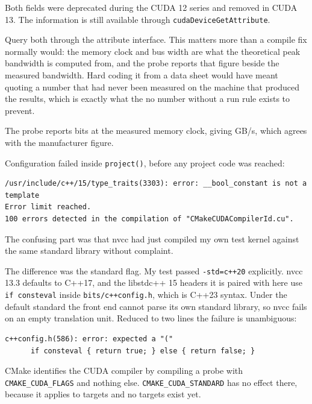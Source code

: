  Both fields were deprecated during the CUDA 12 series and
removed in CUDA 13. The information is still available through
\texttt{cudaDeviceGetAttribute}.

 Query both through the attribute interface. This matters
more than a compile fix normally would: the memory clock and bus width are what
the theoretical peak bandwidth is computed from, and the probe reports that figure beside
the measured bandwidth. Hard coding it from a data sheet would have meant quoting a number that had never
been measured on the machine that produced the results, which is exactly what
the no number without a run rule exists to prevent.

 The probe reports \GpuBusBits{} bits at the measured
memory clock, giving \GpuPeakBandwidth{} GB/s, which agrees with the
manufacturer figure.


 Configuration failed inside \texttt{project()}, before any
project code was reached:

\begin{lstlisting}
/usr/include/c++/15/type_traits(3303): error: __bool_constant is not a template
Error limit reached.
100 errors detected in the compilation of "CMakeCUDACompilerId.cu".
\end{lstlisting}

The confusing part was that nvcc had just compiled my own test kernel against
the same standard library without complaint.

 The difference was the standard flag. My test passed
\texttt{-std=c++20} explicitly. nvcc 13.3 defaults to C++17, and the libstdc++
15 headers it is paired with here use \texttt{if consteval} inside
\texttt{bits/c++config.h}, which is C++23 syntax. Under the default standard
the front end cannot parse its own standard library, so nvcc fails on an empty
translation unit. Reduced to two lines the failure is unambiguous:

\begin{lstlisting}
c++config.h(586): error: expected a "("
      if consteval { return true; } else { return false; }
\end{lstlisting}

CMake identifies the CUDA compiler by compiling a probe with
\texttt{CMAKE\_CUDA\_FLAGS} and nothing else. \texttt{CMAKE\_CUDA\_STANDARD} has
no effect there, because it applies to targets and no targets exist yet.

